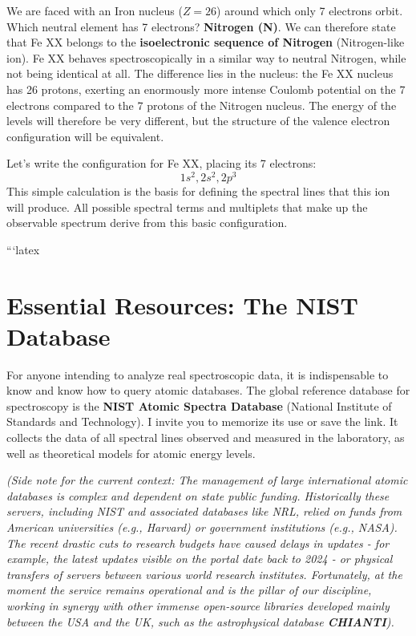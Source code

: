 We are faced with an Iron nucleus ($Z=26$) around which only 7 electrons orbit.
Which neutral element has 7 electrons? \textbf{Nitrogen (N)}.
We can therefore state that Fe XX belongs to the \textbf{isoelectronic sequence of Nitrogen} (Nitrogen-like ion).
Fe XX behaves spectroscopically in a similar way to neutral Nitrogen, while not being identical at all. The difference lies in the nucleus: the Fe XX nucleus has 26 protons, exerting an enormously more intense Coulomb potential on the 7 electrons compared to the 7 protons of the Nitrogen nucleus. The energy of the levels will therefore be very different, but the structure of the valence electron configuration will be equivalent.

Let's write the configuration for Fe XX, placing its 7 electrons:
\begin{equation}
1s^2 , 2s^2 , 2p^3
\end{equation}
This simple calculation is the basis for defining the spectral lines that this ion will produce. All possible spectral terms and multiplets that make up the observable spectrum derive from this basic configuration.

```latex
\section{Essential Resources: The NIST Database}

For anyone intending to analyze real spectroscopic data, it is indispensable to know and know how to query atomic databases.
The global reference database for spectroscopy is the \textbf{NIST Atomic Spectra Database} (National Institute of Standards and Technology).
I invite you to memorize its use or save the link. It collects the data of all spectral lines observed and measured in the laboratory, as well as theoretical models for atomic energy levels.

\textit{(Side note for the current context: The management of large international atomic databases is complex and dependent on state public funding. Historically these servers, including NIST and associated databases like NRL, relied on funds from American universities (e.g., Harvard) or government institutions (e.g., NASA). The recent drastic cuts to research budgets have caused delays in updates - for example, the latest updates visible on the portal date back to 2024 - or physical transfers of servers between various world research institutes. Fortunately, at the moment the service remains operational and is the pillar of our discipline, working in synergy with other immense open-source libraries developed mainly between the USA and the UK, such as the astrophysical database \textbf{CHIANTI}).}

